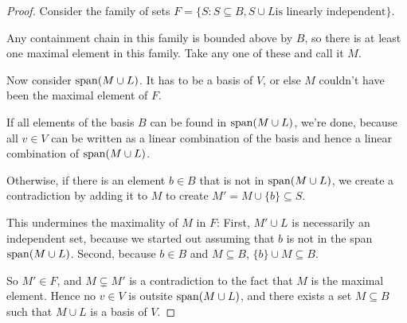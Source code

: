 \documentclass[12pt]{article} %
\newcommand{\s}{{\rm span}}
\begin{document}
\begin{flushleft}
\begin{proof}
  Consider the family of sets $F = \{S: S\subseteq B, S\cup L \text{is linearly independent}\}$.

  Any containment chain in this family is bounded above by $B$, so there is at least one maximal element in this family. Take any one of these and call it $M$.

  Now consider $\s(M\cup L)$. It has to be a basis of $V$, or else $M$ couldn't have been the maximal element of $F$.
  
  If all elements of the basis $B$ can be found in $\s(M\cup L)$, we're done, because all $v\in V$ can be written as a linear combination of the basis and hence a linear combination of $\s(M\cup L)$.
  
  Otherwise, if there is an element $b\in B$ that is not in $\s(M\cup L)$, we create a contradiction by adding it to $M$ to create $M' = M\cup \{b\} \subseteq S$.
  
  This undermines the maximality of $M$ in $F$: First, $M'\cup L$ is necessarily an independent set, because we started out assuming that $b$ is not in the span $\s(M\cup L)$. Second, because $b\in B$ and $M\subseteq B$, $\{b\}\cup M \subseteq B$.

  So $M'\in F$, and $M \subsetneq M'$ is a contradiction to the fact that $M$ is the maximal element.  Hence no $v\in V$ is outsite $\s(M\cup L)$, and there exists a set $M\subseteq B$ such that $M\cup L$ is a basis of $V$.
\end{proof}

\end{flushleft}
\end{document}
